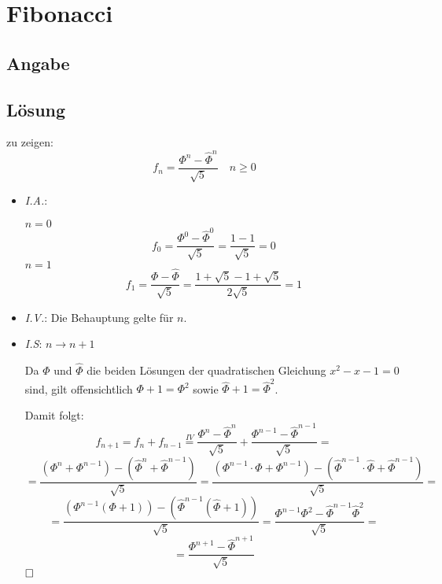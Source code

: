 \section*{Fibonacci}
\subsection*{Angabe}

\subsection*{Lösung}
\begin{flushenum}
\item
  zu zeigen:
  \[ f_n = \frac{\Phi^n - \widehat \Phi^n}{\sqrt{5}} \quad n \geq 0 \]
  \begin{itemize}
    \item \textit{I.A.}:

      $n = 0$
        \[ f_0 = \frac{\Phi^0 - \widehat \Phi^0}{\sqrt{5}} 
               = \frac{1 - 1}{\sqrt{5}} = 0 \]
      $n = 1$
        \[ f_1 = \frac{\Phi - \widehat \Phi}{\sqrt{5}} 
               = \frac{1 + \sqrt{5} - 1 + \sqrt{5}}{2 \sqrt{5}} = 1 \]
    \item \textit{I.V.}: Die Behauptung gelte für $n$.
    \item \textit{I.S}: $n \rightarrow n + 1$

    Da $\Phi$ und $\widehat \Phi$ die beiden Lösungen der quadratischen Gleichung
    $x^2 - x - 1 = 0$ sind, gilt offensichtlich $\Phi + 1 = \Phi^2$ sowie
    $\widehat \Phi + 1 = \widehat \Phi^2$.
    
    Damit folgt:
    \[ f_{n+1} = f_n + f_{n-1} \overset{IV}{=} \frac{\Phi^n - \widehat
       \Phi^n}{\sqrt{5}} + \frac{\Phi^{n-1} - \widehat \Phi^{n-1}}{\sqrt{5}} = \]
    \[ = \frac{(\Phi^n + \Phi^{n-1}) - (\widehat \Phi^n + \widehat \Phi^{n-1})}{\sqrt{5}}
       = \frac{(\Phi^{n-1} \cdot \Phi + \Phi^{n-1}) - 
         (\widehat \Phi^{n-1} \cdot \widehat \Phi + \widehat \Phi^{n-1})}{\sqrt{5}} = \]
    \[ = \frac{(\Phi^{n-1} (\Phi + 1)) - (\widehat \Phi^{n-1} (\widehat \Phi + 1))}{\sqrt{5}} 
       = \frac{\Phi^{n-1} \Phi^2 - \widehat \Phi^{n-1} \widehat \Phi^2}{\sqrt{5}} = \]
    \[ = \frac{\Phi^{n+1} - \widehat \Phi^{n+1}}{\sqrt{5}} \]
    $\hfill \square$
  \end{itemize}


\end{flushenum}
